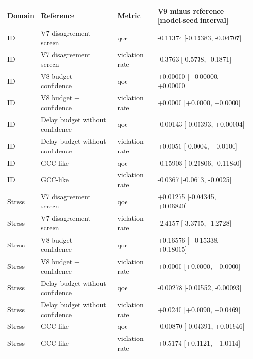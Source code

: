 \begin{tabular}{llll}
\toprule
Domain & Reference & Metric & V9 minus reference [model-seed interval] \\
\midrule
ID & V7 disagreement screen & qoe & -0.11374 [-0.19383, -0.04707] \\
ID & V7 disagreement screen & violation rate & -0.3763 [-0.5738, -0.1871] \\
ID & V8 budget + confidence & qoe & +0.00000 [+0.00000, +0.00000] \\
ID & V8 budget + confidence & violation rate & +0.0000 [+0.0000, +0.0000] \\
ID & Delay budget without confidence & qoe & -0.00143 [-0.00393, +0.00004] \\
ID & Delay budget without confidence & violation rate & +0.0050 [-0.0004, +0.0100] \\
ID & GCC-like & qoe & -0.15908 [-0.20806, -0.11840] \\
ID & GCC-like & violation rate & -0.0367 [-0.0613, -0.0025] \\
Stress & V7 disagreement screen & qoe & +0.01275 [-0.04345, +0.06840] \\
Stress & V7 disagreement screen & violation rate & -2.4157 [-3.3705, -1.2728] \\
Stress & V8 budget + confidence & qoe & +0.16576 [+0.15338, +0.18005] \\
Stress & V8 budget + confidence & violation rate & +0.0000 [+0.0000, +0.0000] \\
Stress & Delay budget without confidence & qoe & -0.00278 [-0.00552, -0.00093] \\
Stress & Delay budget without confidence & violation rate & +0.0240 [+0.0090, +0.0469] \\
Stress & GCC-like & qoe & -0.00870 [-0.04391, +0.01946] \\
Stress & GCC-like & violation rate & +0.5174 [+0.1121, +1.0114] \\
\bottomrule
\end{tabular}
